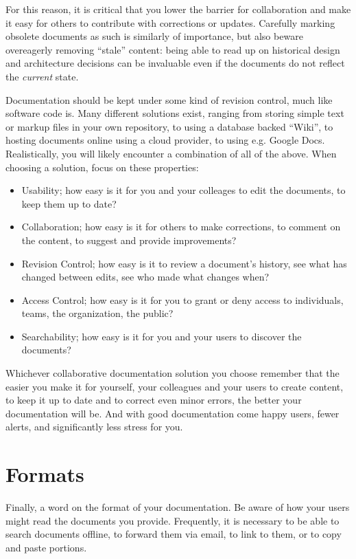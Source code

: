 For this reason, it is critical that you lower the
barrier for collaboration and make it easy for others
to contribute with corrections or updates.  Carefully
marking obsolete documents as such is similarly of
importance, but also beware overeagerly removing
``stale'' content: being able to read up on historical
design and architecture decisions can be invaluable
even if the documents do not reflect the {\em current}
state.

Documentation should be kept under some kind of
revision control, much like software code is.  Many
different solutions exist, ranging from storing simple
text or markup files in your own repository, to using a
database backed ``Wiki'', to hosting
documents online using a cloud provider, to using e.g.
Google Docs.  Realistically, you
will likely encounter a combination of all of the
above.  When choosing a solution, focus on these
properties:

\begin{itemize}
	\item Usability; how easy is it for you and
		your colleages to edit the documents,
		to keep them up to date?
	\item Collaboration; how easy is it for others
		to make corrections, to comment on the content,
		to suggest and provide improvements?
	\item Revision Control; how easy is it to
		review a document's history, see what
		has changed between edits, see who
		made what changes when?
	\item Access Control; how easy is it for you
		to grant or deny access to individuals,
		teams, the organization, the public?
	\item Searchability; how easy is it for you
		and your users to discover the documents?
\end{itemize}

Whichever collaborative documentation solution you
choose remember that the easier you make it for
yourself, your colleagues and your users to create
content, to keep it up to date and to correct even
minor errors, the better your documentation will be.
And with good documentation come happy users, fewer
alerts, and significantly less stress for you.

\section{Formats}
\label{documentation:formats}

Finally, a word on the format of your documentation.
Be aware of how your users might read the documents
you provide.  Frequently, it is necessary to be able
to search documents offline, to forward them via
email, to link to them, or to copy and paste
portions.

